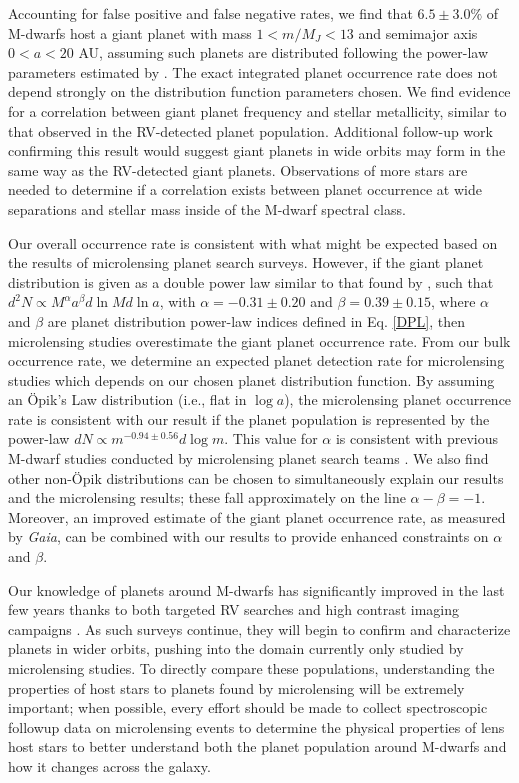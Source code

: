 Accounting for false positive and false negative rates, we find that $6.5 \pm 3.0\%$ of M-dwarfs host a giant planet with mass $1 < m / M_J < 13 $ and semimajor axis $0 < a < 20$ AU, assuming such planets are distributed following the power-law parameters estimated by \citet{Cumming08}. The exact integrated planet occurrence rate does not depend strongly on the distribution function parameters chosen. We find evidence for a correlation between giant planet frequency and stellar metallicity, similar to that observed in the RV-detected planet population. Additional follow-up work confirming this result would suggest giant planets in wide orbits may form in the same way as the RV-detected giant planets. Observations of more stars are needed to determine if a correlation exists between planet occurrence at wide separations and stellar mass inside of the M-dwarf spectral class. 

Our overall occurrence rate is consistent with what might be expected based on the results of microlensing planet search surveys. However, if the giant planet distribution is given as a double power law similar to that found by \citet{Cumming08}, such that $d^2N \propto M^\alpha a^\beta d\ln M d\ln a$, with $\alpha = -0.31 \pm 0.20$ and $\beta = 0.39 \pm 0.15$, where $\alpha$ and $\beta$ are planet distribution power-law indices defined in Eq. \ref{DPL}, then microlensing studies overestimate the giant planet occurrence rate. From our bulk occurrence rate, we determine an expected planet detection rate for microlensing studies which depends on our chosen planet distribution function. By assuming an \"Opik's Law distribution (i.e., flat in $\log a$), the microlensing planet occurrence rate is consistent with our result if the planet population is represented by the power-law $dN \propto m^{-0.94 \pm 0.56} d\log m$. This value for $\alpha$ is consistent with previous M-dwarf studies conducted by microlensing planet search teams \citep{Gould10, Cassan12}. We also find other non-\"Opik distributions can be chosen to simultaneously explain our results and the microlensing results; these fall approximately on the line $\alpha - \beta = -1$. Moreover, an improved estimate of the giant planet occurrence rate, as measured by \textit{Gaia}, can be combined with our results to provide enhanced constraints on $\alpha$ and $\beta$.  

Our knowledge of planets around M-dwarfs has significantly improved in the last few years thanks to both targeted RV searches and high contrast imaging campaigns \citep{Apps10, Bowler12a}. As such surveys continue, they will begin to confirm and characterize planets in wider orbits, pushing into the domain currently only studied by microlensing studies. To directly compare these populations, understanding the properties of host stars to planets found by microlensing will be extremely important; when possible, every effort should be made to collect spectroscopic followup data on microlensing events to determine the physical properties of lens host stars to better understand both the planet population around M-dwarfs and how it changes across the galaxy.

